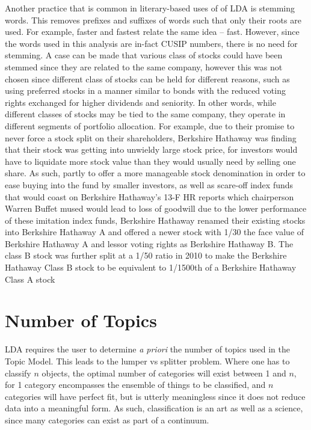 Another practice that is common in literary-based uses of of LDA is stemming words. This removes prefixes and suffixes of words such that only their roots are used.  For example, faster and fastest relate the same idea -- fast.  However, since the words used in this analysis are in-fact CUSIP numbers, there is no need for stemming.   A case can be made that various class of stocks could have been stemmed since they are related to the same company, however this was not chosen since different class of stocks can be held for different reasons, such as using preferred stocks in a manner similar to bonds with the reduced voting rights exchanged for higher dividends and seniority. In other words, while different classes of stocks may be tied to the same company, they operate in different segments of portfolio allocation. For example, due to their promise to never force a stock split on their shareholders, Berkshire Hathaway was finding that their stock was getting into unwieldy large stock price, for investors would have to liquidate more stock value than they would usually need by selling one share.  As such, partly to offer a more manageable stock denomination in order to ease buying into the fund by smaller investors, as well as scare-off index funds that would coast on Berkshire Hathaway's 13-F HR reports which chairperson Warren Buffet mused would lead to loss of goodwill due to the lower performance of these imitation index funds, Berkshire Hathaway renamed their existing stocks into Berkshire Hathaway A and offered a newer stock with 1/30 the face value of Berkshire Hathaway A and lessor voting rights as Berkshire Hathaway B. \citep{Buffet96}  The class B stock was further split at a 1/50 ratio in 2010 to make the Berkshire Hathaway Class B stock to be equivalent to 1/1500th of a Berkshire Hathaway Class A stock \citep{Crippen2010}



\section{Number of Topics}

LDA requires the user to determine \textit{a priori} the number of topics used in the Topic Model.  This leads to the lumper vs splitter problem.  Where one has to classify $n$ objects, the optimal number of categories will exist between 1 and $n$, for 1 category encompasses the ensemble of things to be classified, and $n$ categories will have perfect fit, but is utterly meaningless since it does not reduce data into a meaningful form.  As such, classification is an art as well as a science, since many categories can exist as part of a continuum.

